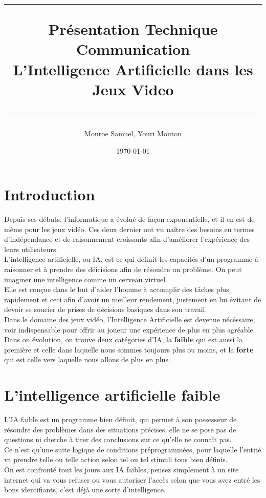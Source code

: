\documentclass[a4paper,10pt,final,fleqn]{article}
\title{
\parbox{15cm}
{ %
  \vspace{3cm}
	\begin{center}\sf\bfseries\Huge
		\rule{15cm}{1pt}
		\medskip
		Présentation Technique Communication \\
		\huge L'Intelligence Artificielle dans les Jeux Video
		\vspace{.5cm}
		\rule{15cm}{1pt}
	\end{center}
	\vspace{3cm}
 }}
\author{Monroe Samuel, Youri Mouton}
\date{\today}
\begin{document}
\maketitle
\newpage

\section{Introduction}
	
	Depuis ses débuts, l'informatique a évolué de façon exponentielle, et il en est de même pour les jeux vidéo. Ces deux dernier ont vu naître des besoins en termes d'indépendance et de raisonnement croissants afin d'améliorer l'expérience des leurs utilisateurs.\\

	L'intelligence artificielle, ou IA, est ce qui définit les capacités d'un programme à raisonner et à prendre des déicisions afin de résoudre un problème. On peut imaginer une intelligence comme un cerveau virtuel.\\
	Elle est conçue dans le but d'aider l'homme à accomplir des tâches plus rapidement et ceci afin d'avoir un meilleur rendement, justement en lui évitant de devoir se soucier de prises de décisions basiques dans son travail.\\

	Dans le domaine des jeux vidéo, l'Intelligence Artificielle est devenue nécéssaire, voir indispensable pour offrir au joueur une expérience de plus en plus agréable.\\

	Dans on évolution, on trouve deux catégories d'IA, la \textbf{faible} qui est aussi la première et celle dans laquelle nous sommes toujours plus ou moins, et la \textbf{forte} qui est celle vers laquelle nous allons de plus en plus.\\

\section{L'intelligence artificielle faible}

	L'IA faible est un programme bien définit, qui permet à son possesseur de résoudre des problèmes dans des situations précises, elle ne se pose pas de questions ni cherche à tirer des conclusions sur ce qu'elle ne connaît pas.\\
	Ce n'est qu'une suite logique de conditions préprogrammées, pour laquelle l'entité va prendre telle ou telle action selon tel ou tel stimuli tous bien définis.\\
	On est confronté tout les jours aux IA faibles, pensez simplement à un site internet qui va vous refuser ou vous autoriser l'accès selon que vous avez entré les bons identifiants, c'est déjà une sorte d'intelligence.\\
	
\end{document}
